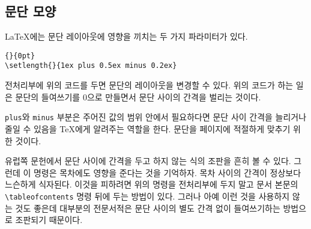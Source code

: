 \subsection{문단 모양} \label{parsp}

\LaTeX 에는 문단 레이아웃에 영향을 끼치는 두 가지 파라미터가 있다.
\begin{code}
\verb|{|\verb|}{0pt}| \\
\verb|\setlength{|\verb|}{1ex plus 0.5ex minus 0.2ex}|
\end{code}
전처리부에 위의 코드를 두면 문단의 레이아웃을 변경할 수 있다. 
위의 코드가 하는 일은 문단의 들여쓰기를 0으로 만들면서 문단 사이의 간격을 벌리는 것이다.

\texttt{plus}와 \texttt{minus} 부분은 주어진 값의 범위 안에서 필요하다면 문단 사이 간격을 늘리거나 줄일 수 있음을 \TeX 에게 알려주는 역할을 한다. 문단을 페이지에 적절하게 맞추기 위한 것이다.

유럽쪽 문헌에서 문단 사이에 간격을 두고  하지 않는 식의 조판을 흔히 볼 수 있다. 그런데 이 명령은 목차에도 영향을 준다는 것을 기억하자.
목차 사이의 간격이 정상보다 느슨하게 식자된다. 
이것을 피하려면 위의 명령을 전처리부에 두지 말고 문서 본문의 \verb|\tableofcontents| 명령 뒤에 두는 방법이 있다. 그러나 아예 이런 것을 사용하지 않는 것도 좋은데 대부분의 전문서적은 문단 사이의 별도 간격 없이 들여쓰기하는 방법으로 조판되기 때문이다.

